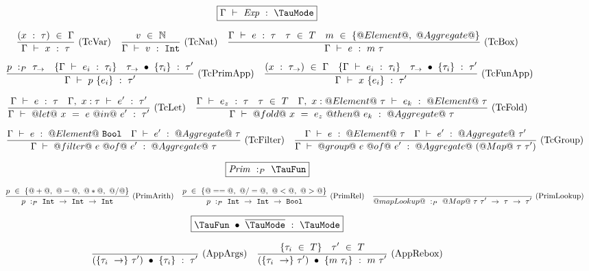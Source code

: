 
\begin{figure*}


$$
\boxed{\Typecheck{\Gamma}{\mi{Exp}}{\TauMode}}
$$


$$
\enskip \frac {\displaystyle 
    (x~:~\tau)~\in~\Gamma
} {\displaystyle  
    \Gamma ~\vdash~ x~:~\tau
} \  \mbox{(TcVar)} \enskip
\enskip \frac {\displaystyle 
  v~\in~\mathbb{N}
} {\displaystyle  
    \Gamma ~\vdash~ v~:~\mathtt{Int}
} \  \mbox{(TcNat)} \enskip
\enskip \frac {\displaystyle 
  \Gamma ~\vdash~ e~:~\tau
  \quad
  \tau~\in~T
  \quad
  m~\in~\{@Element@,~@Aggregate@\}
} {\displaystyle  
    \Gamma ~\vdash~ e~:~m~\tau
} \  \mbox{(TcBox)} \enskip
$$

$$
\enskip \frac {\displaystyle 
    p~:_P~\tau_\to
    \quad
    \{ \Gamma ~\vdash~ e_i~:~\tau_i \}
    \quad
    \tau_\to~\bullet~\{\tau_i\}~:~\tau'
} {\displaystyle  
    \Gamma ~\vdash~ p~\{e_i\}~:~\tau'
} \  \mbox{(TcPrimApp)} \enskip
\enskip \frac {\displaystyle 
    (x~:~\tau_\to)~\in~\Gamma
    \quad
    \{ \Gamma ~\vdash~ e_i~:~\tau_i \}
    \quad
    \tau_\to~\bullet~\{\tau_i\}~:~\tau'
} {\displaystyle  
    \Gamma ~\vdash~ x~\{e_i\}~:~\tau'
} \  \mbox{(TcFunApp)} \enskip
$$

$$
\enskip \frac {\displaystyle 
  \Gamma ~\vdash~ e~:~\tau
  \quad
  \Gamma,~x:\tau ~\vdash~ e'~:~\tau'
} {\displaystyle 
  \Gamma ~\vdash~ @let@~x~=~e~@in@~e'~:~\tau'
} \  \mbox{(TcLet)} \enskip
\enskip \frac {\displaystyle 
  \Gamma ~\vdash~ e_z~:~\tau
  \quad
  \tau~\in~T
  \quad
  \Gamma,~x:@Element@~\tau ~\vdash~ e_k~:~@Element@~\tau
} {\displaystyle 
  \Gamma ~\vdash~ @fold@~x~=~e_z~@then@~e_k~:~@Aggregate@~\tau
} \  \mbox{(TcFold)} \enskip
$$

$$
\enskip \frac {\displaystyle 
  \Gamma ~\vdash~ e~:~@Element@~\mathtt{Bool}
  \quad
  \Gamma ~\vdash~ e'~:~@Aggregate@~\tau
} {\displaystyle 
  \Gamma ~\vdash~ @filter@~e~@of@~e'~:~@Aggregate@~\tau
} \  \mbox{(TcFilter)} \enskip
\enskip \frac {\displaystyle 
  \Gamma ~\vdash~ e~:~@Element@~\tau
  \quad
  \Gamma ~\vdash~ e'~:~@Aggregate@~\tau'
} {\displaystyle 
  \Gamma ~\vdash~ @group@~e~@of@~e'~:~@Aggregate@~(@Map@~\tau~\tau')
} \  \mbox{(TcGroup)} \enskip
$$


$$
\boxed{\TypecheckP{\mi{Prim}}{\TauFun}}
$$

$$
\enskip \frac {\displaystyle 
  p~\in~\{@+@,~@-@,~@*@,~@/@\}
} {\displaystyle 
  p~:_P~\mathtt{Int}~\to~\mathtt{Int}~\to~\mathtt{Int}
} \  \mbox{(PrimArith)} \enskip
\enskip \frac {\displaystyle 
  p~\in~\{@==@,~@/=@,~@<@,~@>@\}
} {\displaystyle 
  p~:_P~\mathtt{Int}~\to~\mathtt{Int}~\to~\mathtt{Bool}
} \  \mbox{(PrimRel)} \enskip
\enskip \frac {\displaystyle } {\displaystyle 
  @mapLookup@~:_P~@Map@~\tau~\tau'~\to~\tau~\to~\tau'
} \  \mbox{(PrimLookup)} \enskip
$$

$$
\boxed{\TypecheckApp{\TauFun}{\ov{\TauMode}}{\TauMode}}
$$

$$
\enskip \frac {\displaystyle 
} {\displaystyle 
  (\{\tau_i~\to\}~\tau')~\bullet~\{\tau_i\}~:~\tau'
} \  \mbox{(AppArgs)} \enskip
\enskip \frac {\displaystyle 
  \{\tau_i~\in~T\}
  \quad
  \tau'~\in~T
} {\displaystyle 
  (\{\tau_i~\to\}~\tau')~\bullet~\{m~\tau_i\}~:~m~\tau'
} \  \mbox{(AppRebox)} \enskip
$$


\end{figure*}
